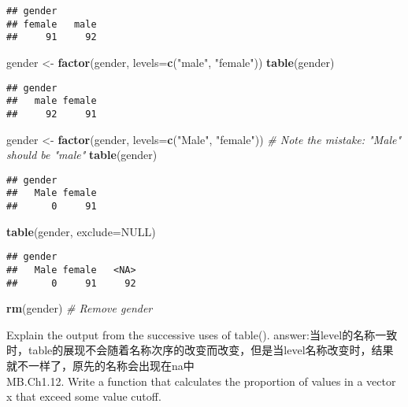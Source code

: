 \documentclass[
]{article}
\newenvironment{Shaded}{\begin{snugshade}}{\end{snugshade}}
\newcommand{\CommentTok}[1]{\textcolor[rgb]{0.56,0.35,0.01}{\textit{#1}}}
\newcommand{\DataTypeTok}[1]{\textcolor[rgb]{0.13,0.29,0.53}{#1}}
\newcommand{\KeywordTok}[1]{\textcolor[rgb]{0.13,0.29,0.53}{\textbf{#1}}}
\newcommand{\NormalTok}[1]{#1}
\newcommand{\OtherTok}[1]{\textcolor[rgb]{0.56,0.35,0.01}{#1}}
\newcommand{\StringTok}[1]{\textcolor[rgb]{0.31,0.60,0.02}{#1}}
\begin{document}
\begin{verbatim}
## gender
## female   male 
##     91     92
\end{verbatim}

\begin{Shaded}
\begin{Highlighting}[]
\NormalTok{gender <-}\StringTok{ }\KeywordTok{factor}\NormalTok{(gender, }\DataTypeTok{levels=}\KeywordTok{c}\NormalTok{(}\StringTok{"male"}\NormalTok{, }\StringTok{"female"}\NormalTok{))}
\KeywordTok{table}\NormalTok{(gender)}
\end{Highlighting}
\end{Shaded}

\begin{verbatim}
## gender
##   male female 
##     92     91
\end{verbatim}

\begin{Shaded}
\begin{Highlighting}[]
\NormalTok{gender <-}\StringTok{ }\KeywordTok{factor}\NormalTok{(gender, }\DataTypeTok{levels=}\KeywordTok{c}\NormalTok{(}\StringTok{"Male"}\NormalTok{, }\StringTok{"female"}\NormalTok{))}
\CommentTok{# Note the mistake: "Male" should be "male"}
\KeywordTok{table}\NormalTok{(gender)}
\end{Highlighting}
\end{Shaded}

\begin{verbatim}
## gender
##   Male female 
##      0     91
\end{verbatim}

\begin{Shaded}
\begin{Highlighting}[]
\KeywordTok{table}\NormalTok{(gender, }\DataTypeTok{exclude=}\OtherTok{NULL}\NormalTok{)}
\end{Highlighting}
\end{Shaded}

\begin{verbatim}
## gender
##   Male female   <NA> 
##      0     91     92
\end{verbatim}

\begin{Shaded}
\begin{Highlighting}[]
\KeywordTok{rm}\NormalTok{(gender)  }\CommentTok{# Remove gender}
\end{Highlighting}
\end{Shaded}

Explain the output from the successive uses of table().
answer:当level的名称一致时，table的展现不会随着名称次序的改变而改变，但是当level名称改变时，结果就不一样了，原先的名称会出现在na中\\
MB.Ch1.12. Write a function that calculates the proportion of values in
a vector x that exceed some value cutoff.
\end{document}
